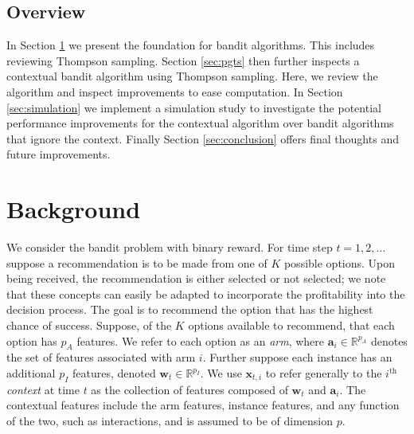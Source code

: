 \documentclass[12pt]{article}
\begin{document}
\subsection{Overview}

In Section \ref{sec:background} we present the foundation for bandit algorithms.
This includes reviewing Thompson sampling.  
Section \ref{sec:pgts} then further inspects a contextual bandit algorithm using 
Thompson sampling. 
Here, we review the algorithm and inspect improvements to ease computation.
In Section \ref{sec:simulation} we implement a simulation study to investigate 
the potential performance improvements for the contextual algorithm over bandit 
algorithms that ignore the context.
Finally Section \ref{sec:conclusion} offers final thoughts and future improvements.

\section{Background} \label{sec:background}

We consider the bandit problem with binary reward.
For time step $t = 1, 2, \ldots$ suppose a recommendation is to be made from one 
of $K$ possible options.
Upon being received, the recommendation is either selected or not selected; we 
note that these concepts can easily be adapted to incorporate the profitability
into the decision process.
The goal is to recommend the option that has the highest chance of success.
Suppose, of the $K$ options available to recommend, that each option has $p_A$ 
features.
We refer to each option as an \textit{arm}, where 
$\bm{a}_i \in \mathbb{R}^{p_A}$
denotes the set of features associated with arm $i$. 
Further suppose each instance has an additional $p_I$ features, denoted 
$\bm{w}_t \in \mathbb{R}^{p_I}$.
We use $\bm{x}_{t,i}$ to refer generally to the $i^{\text{th}}$ \textit{context} 
at time $t$ as the collection of features composed of $\bm{w}_t$ and $\bm{a}_i$. 
The contextual features include the arm features, instance features, and any 
function of the two, such as interactions, and is assumed to be of dimension $p$.
\end{document}
